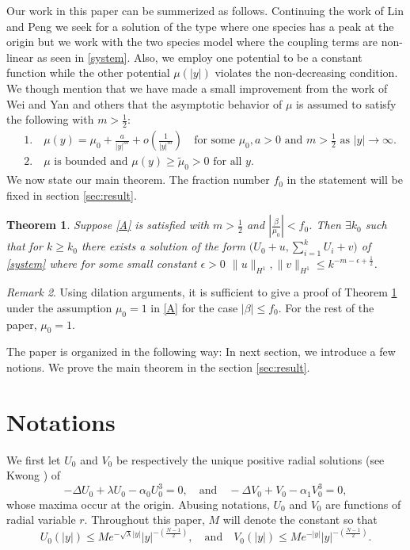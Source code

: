 \documentclass{amsart}
\newtheorem{theorem}{Theorem}[section]
\theoremstyle{definition}
\theoremstyle{remark}
\newtheorem{remark}[theorem]{Remark}
\numberwithin{equation}{section}
\begin{document}
Our work in this paper can be summerized as follows. Continuing the work of Lin and Peng  \cite{lin_peng_2014} we seek for a solution of the type where one species has a peak at the origin but we work with the two species model where the coupling terms are non-linear as seen in \eqref{system}. Also, we employ one potential to be a constant function while the other potential $\mu(|y|)$ violates the non-decreasing condition. We though mention that we have made a small improvement from the work of Wei and Yan \cite{wei_yan_2014} and others that the asymptotic behavior of $\mu$ is assumed to satisfy the following with $m> \frac{1}{2}$:
\begin{equation}\tag{$A$}\label{A}
 \begin{aligned}
  &1. \quad \mu(y) = \mu_0 + \frac{a}{|y|^m} + o\left(\frac{1}{|y|^m}\right) \quad \text{for some $\mu_0,a>0$ and $m> \frac{1}{2}$ as $|y| \rightarrow \infty$.}\\
  &2. \quad \text{$\mu$ is bounded and $\mu(y)\ge \tilde{\mu}_0 > 0$ for all $y$.}
 \end{aligned}
\end{equation}
We now state our main theorem. The fraction number $f_0$ in the statement will be fixed in section \ref{sec:result}.
\begin{theorem} \label{mainthm} Suppose \eqref{A} is satisfied with $m > \frac{1}{2}$ and $\left|\frac{\beta}{\mu_0}\right| < f_0$. Then $\exists k_0$ such that for $k\ge k_0$ there exists a solution of the form $\Big(U_0 +u, \displaystyle \sum_{i=1}^k U_i + v\Big)$ of \eqref{system} where for some small constant $\epsilon>0$ $ \|u\|_{H^1},  \|v\|_{H^1} \le k^{-m -\epsilon + \frac{1}{2}}$.
\end{theorem}
\begin{remark}
  Using dilation arguments, it is sufficient to give a proof of Theorem \ref{mainthm} under the assumption $\mu_0=1$ in \eqref{A} for the  case $|\beta| \le f_0$. For the rest of the paper, $\mu_0=1$.
\end{remark}
The paper is organized in the following way: In next section, we introduce a few notions. We prove the main theorem in the section \ref{sec:result}.

\section{Notations} \label{notions}

We first let $U_{0}$ and $V_{0}$ be respectively the unique  {positive} radial solutions (see Kwong \cite{Kwong}) of
\begin{equation}\label{u0v0}
 -\Delta U_{0} + \lambda U_{0} - \alpha_0 U_{0}^3 = 0, \quad \text{and} \quad -\Delta V_{0} + V_{0} - \alpha_1 V_{0}^3 = 0,
\end{equation}
whose maxima occur at the origin. Abusing notations, $U_{0}$ and $V_{0}$ are functions of radial variable $r$. Throughout this paper, $M$ will denote the constant so that
\begin{equation}\label{exp}U_{0}(|y|) \le Me^{-\sqrt{\lambda}|y|}|y|^{-\left(\frac{N-1}{2}\right)}, \quad \text{and} \quad V_{0}(|y|) \le Me^{-|y|}|y|^{-\left(\frac{N-1}{2}\right)}.\end{equation}
\end{document}
